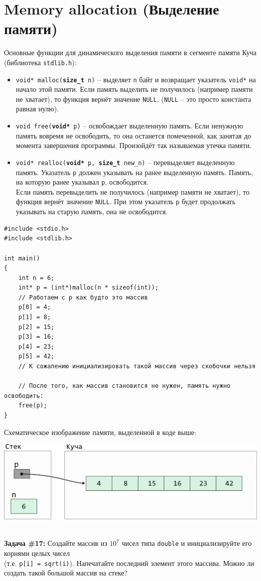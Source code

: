 \documentclass{article}
\begin{document}
\section*{Memory allocation (Выделение памяти)}
Основные функции для динамического выделения памяти в сегменте памяти Куча (библиотека \texttt{stdlib.h}):
\begin{itemize}
\item \texttt{void* malloc(\textbf{size\_t} n)} -- выделяет \texttt{n} байт и возвращает указатель \texttt{void*}
на начало этой памяти. Если память выделить не получилось (например памяти не хватает), то функция вернёт значение \texttt{NULL}. (\texttt{NULL} -- это просто константа равная нулю). \\
\item \texttt{void free(\textbf{void*} p)} -- освобождает выделенную память. Если ненужную память вовремя не освободить, то она останется помеченной, как занятая до момента завершения программы. Произойдёт так называемая утечка памяти.\\
\item \texttt{void* realloc(\textbf{void*} p, \textbf{size\_t} new\_n)} -- перевыделяет выделенную память. Указатель \texttt{p} должен указывать на ранее выделенную память. Память, на которую ранее указывал \texttt{p}, освободится. \\
Если память перевыделить не получилось (например памяти не хватает), то функция вернёт значение \texttt{NULL}. При этом указатель \texttt{p} будет продолжать указывать на старую память, она не освободится.\\
\end{itemize}
\begin{lstlisting}
#include <stdio.h>
#include <stdlib.h>

int main()
{
	int n = 6;
	int* p = (int*)malloc(n * sizeof(int)); 
	// Работаем с p как будто это массив
	p[0] = 4;
	p[1] = 8;
	p[2] = 15;
	p[3] = 16;
	p[4] = 23;
	p[5] = 42;
	// К сожалению инициализировать такой массив через скобочки нельзя
	
	// После того, как массив становится не нужен, память нужно освободить:
	free(p);
}
\end{lstlisting}
Схематическое изображение памяти, выделенной в коде выше:
\begin{center}
\includegraphics[scale=0.9]{../../images/pointer_schemes/pointer_to_heap_array.png}
\end{center}
\quad\\
\textbf{Задача \#17:} Создайте массив из $10^7$ чисел типа \texttt{double} и инициализируйте его корнями
целых чисел\\ (т.е. \texttt{p[i] = sqrt(i)}). Напечатайте последний элемент этого массива. Можно ли 
создать такой большой массив на стеке?
\end{document}
